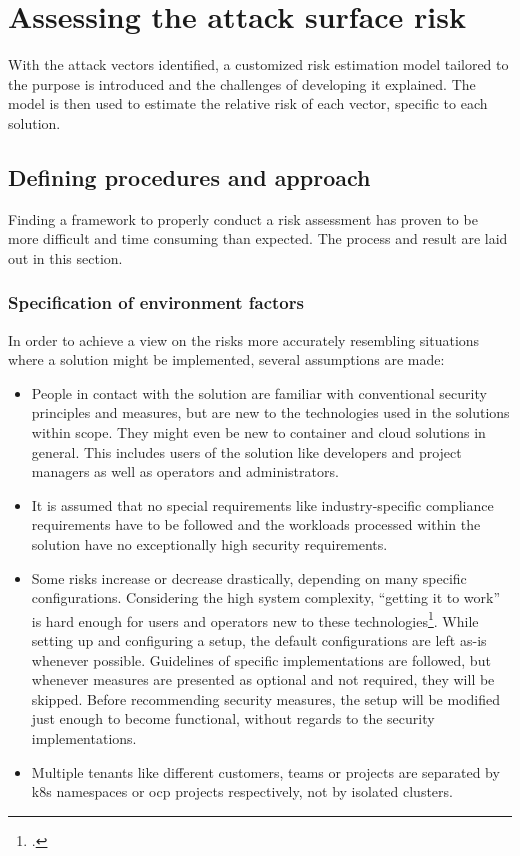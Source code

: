 \chapter{Assessing the attack surface risk} \label{riskAssessTotal}
\setcounter{footnote}{0}
With the attack vectors identified, a customized risk estimation model tailored to the purpose is introduced and the challenges of developing it explained. The model is then used to estimate the relative risk of each vector, specific to each solution.

\section{Defining procedures and approach}
Finding a framework to properly conduct a risk assessment has proven to be more difficult and time consuming than expected. The process and result are laid out in this section.

\subsection{Specification of environment factors} \label{envDefine}
In order to achieve a view on the risks more accurately resembling situations where a solution might be implemented, several assumptions are made:

\begin{itemize}

\item People in contact with the solution are familiar with conventional security principles and measures, but are new to the technologies used in the solutions within scope. They might even be new to container and cloud solutions in general. This includes users of the solution like developers and project managers as well as operators and administrators.

\item It is assumed that no special requirements like industry-specific compliance requirements have to be followed and the workloads processed within the solution have no exceptionally high security requirements. 

\item Some risks increase or decrease drastically, depending on many specific configurations. Considering the high system complexity, ``getting it to work'' is hard enough for users and operators new to these technologies\footcite[][, starting at 3:05]{hackAndHarden}. While setting up and configuring a setup, the default configurations are left as-is whenever possible. Guidelines of specific implementations are followed, but whenever measures are presented as optional and not required, they will be skipped. Before recommending security measures, the setup will be modified just enough to become functional, without regards to the security implementations.

\item Multiple tenants like different customers, teams or projects are separated by \gls{k8s} namespaces or \gls{ocp} projects respectively, not by isolated clusters.

\end{itemize}

